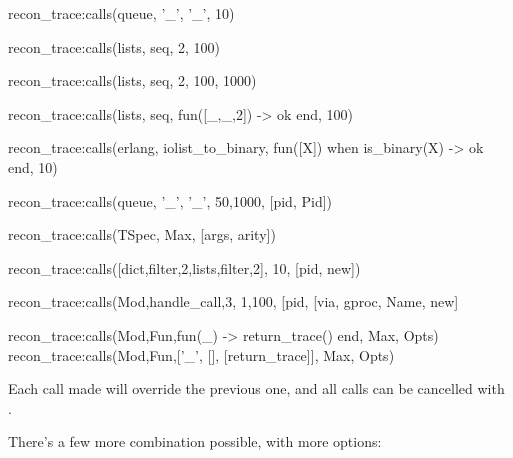 \begin{VerbatimErl}
recon_trace:calls({queue, '_', '_'}, 10)

recon_trace:calls({lists, seq, 2}, 100)

recon_trace:calls({lists, seq, 2}, {100, 1000})

recon_trace:calls({lists, seq, fun([_,_,2]) -> ok end}, 100)

recon_trace:calls({erlang, iolist_to_binary,
                   fun([X]) when is_binary(X) -> ok end},
                  10)

recon_trace:calls({queue, '_', '_'}, {50,1000}, [{pid, Pid}])

recon_trace:calls(TSpec, Max, [{args, arity}])

recon_trace:calls([{dict,filter,2},{lists,filter,2}], 10, [{pid, new}])

recon_trace:calls({Mod,handle_call,3}, {1,100}, [{pid, [{via, gproc, Name}, new]}

recon_trace:calls({Mod,Fun,fun(_) -> return_trace() end}, Max, Opts)
recon_trace:calls({Mod,Fun,[{'_', [], [{return_trace}]}]}, Max, Opts)

\end{VerbatimErl}

Each call made will override the previous one, and all calls can be cancelled with .

There's a few more combination possible, with more options:

